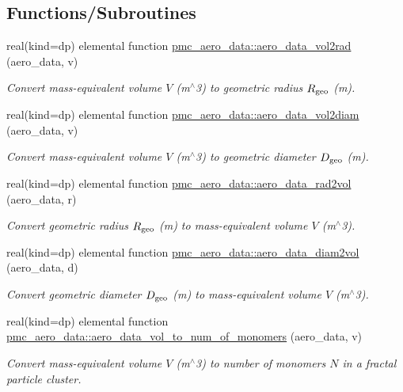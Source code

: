 \subsection*{Functions/\+Subroutines}
\begin{DoxyCompactItemize}
\item 
real(kind=dp) elemental function \mbox{\hyperlink{namespacepmc__aero__data_a807a9e4daf3a31625a1ddb3a179fb1e7}{pmc\+\_\+aero\+\_\+data\+::aero\+\_\+data\+\_\+vol2rad}} (aero\+\_\+data, v)
\begin{DoxyCompactList}\small\item\em Convert mass-\/equivalent volume $V$ (m$^\wedge$3) to geometric radius $R_{\rm geo}$ (m). \end{DoxyCompactList}\item 
real(kind=dp) elemental function \mbox{\hyperlink{namespacepmc__aero__data_a02632f93bb71ae990e2a8196d3940f77}{pmc\+\_\+aero\+\_\+data\+::aero\+\_\+data\+\_\+vol2diam}} (aero\+\_\+data, v)
\begin{DoxyCompactList}\small\item\em Convert mass-\/equivalent volume $V$ (m$^\wedge$3) to geometric diameter $D_{\rm geo}$ (m). \end{DoxyCompactList}\item 
real(kind=dp) elemental function \mbox{\hyperlink{namespacepmc__aero__data_a23092e214084d2b6ede337d0437c9358}{pmc\+\_\+aero\+\_\+data\+::aero\+\_\+data\+\_\+rad2vol}} (aero\+\_\+data, r)
\begin{DoxyCompactList}\small\item\em Convert geometric radius $R_{\rm geo}$ (m) to mass-\/equivalent volume $V$ (m$^\wedge$3). \end{DoxyCompactList}\item 
real(kind=dp) elemental function \mbox{\hyperlink{namespacepmc__aero__data_a2e6484e2aeeb8aea7f9362d52ab7d32d}{pmc\+\_\+aero\+\_\+data\+::aero\+\_\+data\+\_\+diam2vol}} (aero\+\_\+data, d)
\begin{DoxyCompactList}\small\item\em Convert geometric diameter $D_{\rm geo}$ (m) to mass-\/equivalent volume $V$ (m$^\wedge$3). \end{DoxyCompactList}\item 
real(kind=dp) elemental function \mbox{\hyperlink{namespacepmc__aero__data_a48a43b61e8f730503594919d154a04d0}{pmc\+\_\+aero\+\_\+data\+::aero\+\_\+data\+\_\+vol\+\_\+to\+\_\+num\+\_\+of\+\_\+monomers}} (aero\+\_\+data, v)
\begin{DoxyCompactList}\small\item\em Convert mass-\/equivalent volume $V$ (m$^\wedge$3) to number of monomers $N$ in a fractal particle cluster. \end{DoxyCompactList}\item 

\end{DoxyCompactItemize}
